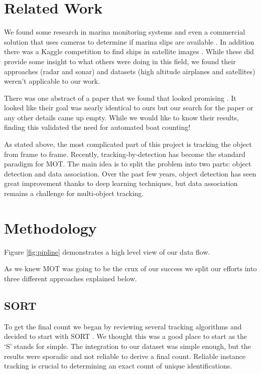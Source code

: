 \documentclass[10pt,twocolumn,letterpaper]{article}
\begin{document}
\section{Related Work}

We found some research in marina monitoring systems \cite{marina_boatdetector} and even a commercial solution that uses cameras to determine if marina slips are available \cite{Nuvis}. In addition there was a Kaggle competition to find ships in satellite images \cite{kaggle_ship_detection, Stofa_2020}. While these did provide some insight to what others were doing in this field, we found their approaches (radar and sonar) and datasets (high altitude airplanes and satellites) weren't applicable to our work.

There was one abstract of a paper that we found that looked promising \cite{UCalagary}. It looked like their goal was nearly identical to ours but our search for the paper or any other details came up empty. While we would like to know their results, finding this validated the need for automated boat counting!

As stated above, the most complicated part of this project is tracking the object from frame to frame. Recently, tracking-by-detection has become the standard paradigm for MOT. The main idea is to split the problem into two parts: object detection and data association. Over the past few years, object detection has seen great improvement thanks to deep learning techniques\cite{https://doi.org/10.48550/arxiv.1506.01497}, but data association remains a challenge for multi-object tracking.

\section{Methodology}

Figure \ref{fig:pipline} demonstrates a high level view of our data flow. 

As we knew MOT was going to be the crux of our success we split our efforts into three different approaches explained below.

\subsection{SORT}

To get the final count we began by reviewing several tracking algorithms and decided to start with SORT \cite{Bewley_2016}. We thought this was a good place to start as the `S' stands for simple.  The integration to our dataset was simple enough, but the results were sporadic and not reliable to derive a final count. Reliable instance tracking is crucial to determining an exact count of unique identifications.
\end{document}
